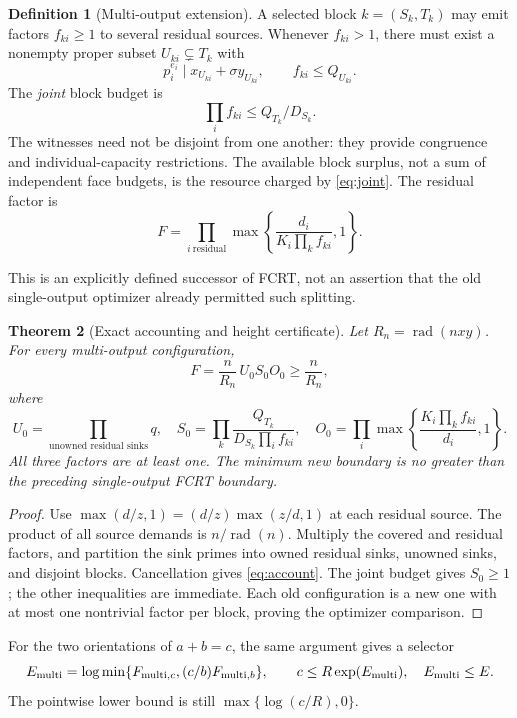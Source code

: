 \documentclass[11pt]{article}
\newtheorem{theorem}{Theorem}[section]
\theoremstyle{definition}\newtheorem{definition}[theorem]{Definition}
\theoremstyle{remark}\newtheorem{remark}[theorem]{Remark}
\newcommand{\rad}{\operatorname{rad}}
\begin{document}
\begin{definition}[Multi-output extension]
A selected block \(k=(S_k,T_k)\) may emit factors \(f_{ki}\ge1\) to several residual sources. Whenever \(f_{ki}>1\), there must exist a nonempty proper subset \(U_{ki}\subsetneq T_k\) with
\[
 p_i^{e_i}\mid x_{U_{ki}}+\sigma y_{U_{ki}},\qquad f_{ki}\le Q_{U_{ki}}.
\]
The \emph{joint} block budget is
\begin{equation}\label{eq:joint}
 \prod_i f_{ki}\le Q_{T_k}/D_{S_k}.
\end{equation}
The witnesses need not be disjoint from one another: they provide congruence and individual-capacity restrictions. The available block surplus, not a sum of independent face budgets, is the resource charged by \eqref{eq:joint}. The residual factor is
\[
 F=\prod_{i\ \mathrm{residual}}\max\left\{\frac{d_i}{K_i\prod_k f_{ki}},1\right\}.
\]
\end{definition}
This is an explicitly defined successor of FCRT, not an assertion that the old single-output optimizer already permitted such splitting.

\begin{theorem}[Exact accounting and height certificate]\label{thm:account}
Let \(R_n=\rad(nxy)\). For every multi-output configuration,
\begin{equation}\label{eq:account}
 F=\frac{n}{R_n}\,U_0S_0O_0\ge\frac{n}{R_n},
\end{equation}
where
\[
 U_0=\prod_{\text{unowned residual sinks}}q,\quad
 S_0=\prod_k\frac{Q_{T_k}}{D_{S_k}\prod_i f_{ki}},\quad
 O_0=\prod_i\max\left\{\frac{K_i\prod_k f_{ki}}{d_i},1\right\}.
\]
All three factors are at least one. The minimum new boundary is no greater than the preceding single-output FCRT boundary.
\end{theorem}
\begin{proof}
Use \(\max(d/z,1)=(d/z)\max(z/d,1)\) at each residual source. The product of all source demands is \(n/\rad(n)\). Multiply the covered and residual factors, and partition the sink primes into owned residual sinks, unowned sinks, and disjoint blocks. Cancellation gives \eqref{eq:account}. The joint budget gives \(S_0\ge1\); the other inequalities are immediate. Each old configuration is a new one with at most one nontrivial factor per block, proving the optimizer comparison.
\end{proof}
For the two orientations of \(a+b=c\), the same argument gives a selector
\[
 E_{\rm multi}=\log\min\{F_{{\rm multi},c},(c/b)F_{{\rm multi},b}\},\qquad
 c\le R\exp(E_{\rm multi}),\quad E_{\rm multi}\le E.
\]
The pointwise lower bound is still \(\max\{\log(c/R),0\}\).
\end{document}
